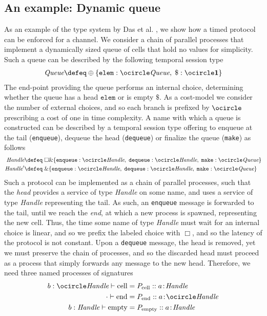\subsection{An example: Dynamic queue}
As an example of the type system by Das et al. \cite{DasEtAl2018}, we show how a timed protocol can be enforced for a channel. We consider a chain of parallel processes that implement a dynamically sized queue of cells that hold no values for simplicity. Such a queue can be described by the following temporal session type
\begin{align*}
    \textit{Queue} \defeq \oplus\{\texttt{elem} : \ocircle\textit{Queue},\; \$ : \ocircle\mathbf{1}\}
\end{align*}
The end-point providing the queue performs an internal choice, determining whether the queue has a head $\texttt{elem}$ or is empty $\$$. As a cost-model we consider the number of external choices, and so each branch is prefixed by $\ocircle$ prescribing a cost of one in time complexity. A name with which a queue is constructed can be described by a temporal session type offering to enqueue at the tail (\texttt{enqueue}), dequeue the head (\texttt{dequeue}) or finalize the queue (\texttt{make}) as follows
\begin{align*}
    \textit{Handle} \defeq&\; \Box\&\{\texttt{enqueue} : \ocircle\textit{Handle},\; \texttt{dequeue} : \ocircle\textit{Handle},\; \texttt{make} : \ocircle\textit{Queue} \}\\
    \textit{Handle}' \defeq&\; \&\{\texttt{enqueue} : \ocircle\textit{Handle},\; \texttt{dequeue} : \ocircle\textit{Handle},\; \texttt{make} : \ocircle\textit{Queue} \}
\end{align*}
Such a protocol can be implemented as a chain of parallel processes, such that the \textit{head} provides a service of type \textit{Handle} on some name, and uses a service of type \textit{Handle} representing the tail. As such, an \texttt{enqueue} message is forwarded to the tail, until we reach the \textit{end}, at which a new process is spawned, representing the new cell. Thus, the time some name of type \textit{Handle} must wait for an internal choice is linear, and so we prefix the labeled choice with $\Box$, and so the latency of the protocol is not constant. Upon a \texttt{dequeue} message, the head is removed, yet we must preserve the chain of processes, and so the discarded head must proceed as a process that simply forwards any message to the new head. Therefore, we need three named processes of signatures
\begin{align*}
    b : \ocircle\textit{Handle} \vdash \text{cell} &= P_{\text{cell}} :: a\!:\!\textit{Handle}\\
    \cdot \vdash \text{end} &= P_{\text{end}} :: a\!:\!\ocircle\textit{Handle}\\
    b : \textit{Handle} \vdash \text{empty} &= P_{\text{empty}} :: a\!:\!\textit{Handle}
\end{align*}
